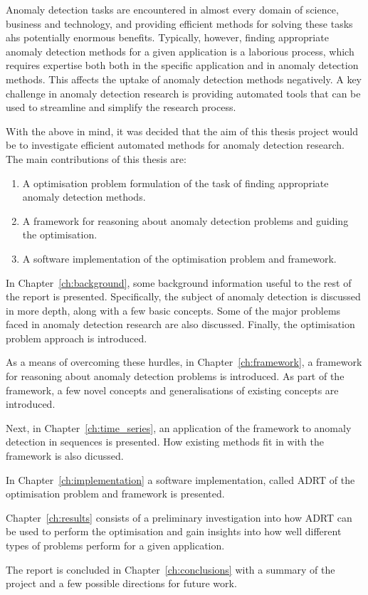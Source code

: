 
Anomaly detection tasks are encountered in almost every domain of science, business and technology, and providing efficient methods for solving these tasks ahs potentially enormous benefits. Typically, however, finding appropriate anomaly detection methods for a given application is a laborious process, which requires expertise both both in the specific application and in anomaly detection methods. This affects the uptake of anomaly detection methods negatively. A key challenge in anomaly detection research is providing automated tools that can be used to streamline and simplify the research process.

With the above in mind, it was decided that the aim of this thesis project would be to investigate efficient automated methods for anomaly detection research. The main contributions of this thesis are:
\begin{enumerate}
    \item A optimisation problem formulation of the task of finding appropriate anomaly detection methods.
    \item A framework for reasoning about anomaly detection problems and guiding the optimisation.
    \item A software implementation of the optimisation problem and framework.
\end{enumerate}

In Chapter~\ref{ch:background}, some background information useful to the rest of the report is presented. Specifically, the subject of anomaly detection is discussed in more depth, along with a few basic concepts. Some of the major problems faced in anomaly detection research are also discussed. Finally, the optimisation problem approach is introduced.

As a means of overcoming these hurdles, in Chapter~\ref{ch:framework}, a framework for reasoning about anomaly detection problems is introduced. As part of the framework, a few novel concepts and generalisations of existing concepts are introduced.

Next, in Chapter~\ref{ch:time_series}, an application of the framework to anomaly detection in sequences is presented. How existing methods fit in with the framework is also dicussed.

In Chapter~\ref{ch:implementation} a software implementation, called ADRT of the optimisation problem and framework is presented.

Chapter~\ref{ch:results} consists of a preliminary investigation into how ADRT can be used to perform the optimisation and gain insights into how well different types of problems perform for a given application.

The report is concluded in Chapter~\ref{ch:conclusions} with a summary of the project and a few possible directions for future work.

